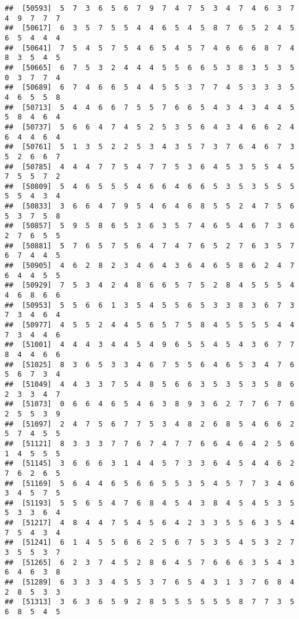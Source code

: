 \documentclass[
]{book}
\begin{document}
\begin{verbatim}
##  [50593]  5  7  3  6  5  6  7  9  7  4  7  5  3  4  7  4  6  3  7  4  9  7  7  7
##  [50617]  6  3  5  7  5  5  4  4  6  5  4  5  8  7  6  5  2  4  5  6  5  4  4  4
##  [50641]  7  5  4  5  7  5  4  6  5  4  5  7  4  6  6  6  8  7  4  8  3  5  4  5
##  [50665]  6  7  5  3  2  4  4  4  5  5  6  6  5  3  8  3  5  3  5  0  3  7  7  4
##  [50689]  6  7  4  6  6  5  4  4  5  5  3  7  7  4  5  3  3  3  5  4  6  5  5  8
##  [50713]  5  4  4  6  6  7  5  5  7  6  6  5  4  3  4  3  4  4  5  5  8  4  6  4
##  [50737]  5  6  6  4  7  4  5  2  5  3  5  6  4  3  4  6  6  2  4  6  4  4  6  4
##  [50761]  5  1  3  5  2  2  5  3  4  3  5  7  3  7  6  4  6  7  3  5  2  6  6  7
##  [50785]  4  4  4  7  7  5  4  7  7  5  3  6  4  5  3  5  5  4  5  7  5  5  7  2
##  [50809]  5  4  6  5  5  5  4  6  6  4  6  6  5  3  5  3  5  5  5  5  5  4  3  4
##  [50833]  3  6  6  4  7  9  5  4  6  4  6  8  5  5  2  4  7  5  6  5  3  7  5  8
##  [50857]  5  9  5  8  6  5  3  6  3  5  7  4  6  5  4  6  7  3  6  2  7  6  5  5
##  [50881]  5  7  6  5  7  5  6  4  7  4  7  6  5  2  7  6  3  5  7  6  7  4  4  5
##  [50905]  4  6  2  8  2  3  4  6  4  3  6  4  6  5  8  6  2  4  7  6  4  4  5  5
##  [50929]  7  5  3  4  2  4  8  6  6  5  7  5  2  8  4  5  5  5  4  4  6  8  6  6
##  [50953]  5  5  6  6  1  3  5  4  5  5  6  5  3  3  8  3  6  7  3  7  3  4  6  4
##  [50977]  4  5  5  2  4  4  5  6  5  7  5  8  4  5  5  5  5  4  4  7  3  4  4  6
##  [51001]  4  4  4  3  4  4  5  4  9  6  5  5  4  5  4  3  6  7  7  8  4  4  6  6
##  [51025]  8  3  6  5  3  3  4  6  7  5  5  6  4  6  5  3  4  7  6  5  6  7  3  4
##  [51049]  4  4  3  3  7  5  4  8  5  6  6  3  5  3  5  3  5  8  6  2  3  3  4  7
##  [51073]  0  6  6  4  6  5  4  6  3  8  9  3  6  2  7  7  6  7  6  2  5  5  3  9
##  [51097]  2  4  7  5  6  7  7  5  3  4  8  2  6  8  5  4  6  6  2  5  7  4  5  5
##  [51121]  8  3  3  3  7  7  6  7  4  7  7  6  6  4  6  4  2  5  6  1  4  5  5  5
##  [51145]  3  6  6  6  3  1  4  4  5  7  3  3  6  4  5  4  4  6  2  7  6  2  6  5
##  [51169]  5  6  4  4  6  5  6  6  5  5  3  5  4  5  7  7  3  4  6  3  4  5  7  5
##  [51193]  5  5  6  5  4  7  6  8  4  5  4  3  8  4  5  4  5  3  5  5  3  3  6  4
##  [51217]  4  8  4  4  7  5  4  5  6  4  2  3  3  5  5  6  3  5  4  7  5  4  3  4
##  [51241]  6  1  4  5  5  6  6  2  5  6  7  5  3  5  4  5  3  2  7  3  5  5  3  7
##  [51265]  6  2  3  7  4  5  2  8  6  4  5  7  6  6  6  3  5  4  3  6  4  6  3  8
##  [51289]  6  3  3  3  4  5  5  3  7  6  5  4  3  1  3  7  6  8  4  2  8  5  3  3
##  [51313]  3  6  3  6  5  9  2  8  5  5  5  5  5  5  8  7  7  3  5  6  8  5  4  5

\end{verbatim}
\end{document}
